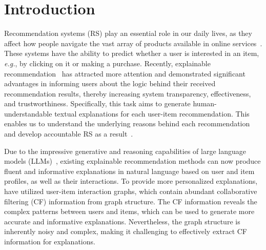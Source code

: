 \section{Introduction}


Recommendation systems (RS) play an essential role in our daily lives, as they affect how people navigate the vast array of products available in online services~\cite{lu2015recommender,he2017neural,wu2024survey,zhao2023cross1,zhao2023cross, zhang2022knowledge, chen2024shopping}. These systems have the ability to predict whether a user is interested in an item, \textit{e.g.}, by clicking on it or making a purchase. Recently, explainable recommendation~\cite{zhang2020explainable,zhang2014explicit,wang2018tem,peake2018explanation} has attracted more attention and demonstrated significant advantages in informing users about the logic behind their received recommendation results, thereby increasing system transparency, effectiveness, and trustworthiness. Specifically, this task aims to generate human-understandable textual explanations for each user-item recommendation. This enables us to understand the underlying reasons behind each recommendation and develop accountable RS as a result~\cite{chen2022measuring}. 

Due to the impressive generative and reasoning capabilities of large language models (LLMs)~\cite{li2024graph,li2023survey,li2024glbench,tang2024grapharena,li2024zerog,chen2024graphwiz,li2023unlocking}, existing explainable recommendation methods \cite{li2021personalized,ma2024xrec,li2023personalized} can now produce fluent and informative explanations in natural language based on user and item profiles, as well as their interactions. To provide more personalized explanations, \cite{ma2024xrec} have utilized user-item interaction graphs, which contain abundant collaborative filtering (CF) information from graph structure. The CF information \cite{herlocker2000explaining} reveals the complex patterns between users and items, which can be used to generate more accurate and informative explanations. Nevertheless, the graph structure is inherently noisy and complex, making it challenging to effectively extract CF information for explanations.

